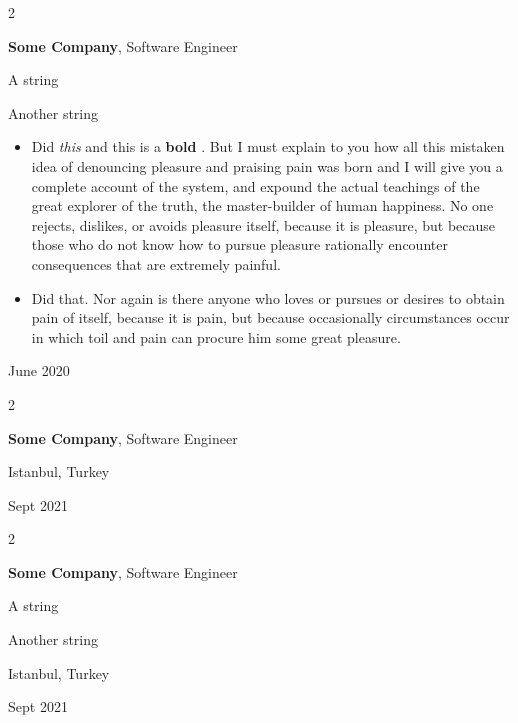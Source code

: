 \documentclass[10pt, letterpaper]{article}
\newenvironment{summary}{
    \begin{description}[
        topsep=0.10 cm,
        parsep=0.10 cm,
        partopsep=0pt,
        itemsep=0pt,
        leftmargin=0.4 cm + 10pt
    ]
}{
    \end{description}
} %
\newenvironment{highlights}{
    \begin{itemize}[
        topsep=0.10 cm,
        parsep=0.10 cm,
        partopsep=0pt,
        itemsep=0pt,
        leftmargin=0.4 cm + 10pt
    ]
}{
    \end{itemize}
} %
\newenvironment{twocolentry}[2][]{
    \onecolentry
    \def\secondColumn{#2}
    \setcolumnwidth{\fill, 4.5 cm}
    \begin{paracol}{2}
}{
    \switchcolumn \raggedleft \secondColumn
    \end{paracol}
    \endonecolentry
} %
\let\hrefWithoutArrow\href
\renewcommand{\href}[2]{\hrefWithoutArrow{#1}{\ifthenelse{\equal{#2}{}}{ }{#2 }\raisebox{.15ex}{\footnotesize \faExternalLink*}}}
\begin{document}
        \vspace{0.2 cm}

        \begin{twocolentry}{
            June 2020
        }
            \textbf{Some \textnormal{Company}}, Software Engineer
            \begin{summary}
                \item A string
                \item Another string
            \end{summary}
            \begin{highlights}
                \item Did \textit{this} and this is a \textbf{bold} \href{https://example.com}{link}. But I must explain to you how all this mistaken idea of denouncing pleasure and praising pain was born and I will give you a complete account of the system, and expound the actual teachings of the great explorer of the truth, the master-builder of human happiness. No one rejects, dislikes, or avoids pleasure itself, because it is pleasure, but because those who do not know how to pursue pleasure rationally encounter consequences that are extremely painful.
                \item Did that. Nor again is there anyone who loves or pursues or desires to obtain pain of itself, because it is pain, but because occasionally circumstances occur in which toil and pain can procure him some great pleasure.
            \end{highlights}
        \end{twocolentry}


        \vspace{0.2 cm}

        \begin{twocolentry}{
            Istanbul, Turkey

        Sept 2021
        }
            \textbf{Some \textnormal{Company}}, Software Engineer
        \end{twocolentry}


        \vspace{0.2 cm}

        \begin{twocolentry}{
            Istanbul, Turkey

        Sept 2021
        }
            \textbf{Some \textnormal{Company}}, Software Engineer
            \begin{summary}
                \item A string
                \item Another string
            \end{summary}
        \end{twocolentry}
\end{document}
